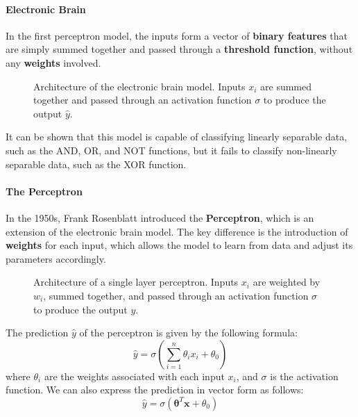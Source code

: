 \paragraph{Electronic Brain}
In the first perceptron model, the inputs form a vector of \textbf{binary features} that are simply summed together and passed through a \textbf{threshold function},
without any \textbf{weights} involved.
\begin{figure}[H]
    \centering
    \scalebox{0.8}{
        
    }
    \caption{Architecture of the electronic brain model. Inputs $x_i$ are summed together and passed through an activation function $\sigma$ to produce the output $\hat{y}$.}
    \label{fig:electronic_brain}
\end{figure}
It can be shown that this model is capable of classifying linearly separable data, such as the AND, OR, and NOT functions, but it fails to classify non-linearly separable data, such as the XOR function.

\paragraph{The Perceptron}
In the 1950s, Frank Rosenblatt introduced the \textbf{Perceptron}, which is an extension of the electronic brain model.
The key difference is the introduction of \textbf{weights} for each input, which allows the model to learn from data and adjust its parameters accordingly.
\begin{figure}[H]
    \centering
    \scalebox{0.8}{
        
    }
    \caption{Architecture of a single layer perceptron. Inputs $x_i$ are weighted by $w_i$, summed together, and passed through an activation function $\sigma$ to produce the output $y$.}
    \label{fig:single_perceptron}
\end{figure}
The prediction $\hat{y}$ of the perceptron is given by the following formula:
\begin{equation}
    \hat{y} = \sigma\left(\sum_{i=1}^{n} \theta_i x_i + \theta_0\right)
\end{equation}
where $\theta_i$ are the weights associated with each input $x_i$, and $\sigma$ is the activation function.
We can also express the prediction in vector form as follows:
\begin{equation}
    \hat{y} = \sigma\left(\boldsymbol{\theta}^T \boldsymbol{x} + \theta_0\right)
\end{equation}

